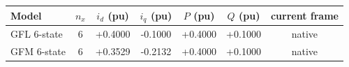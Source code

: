 \begin{tabular}{lcccccc}\toprule
Model & $n_x$ & $i_d$ (pu) & $i_q$ (pu) & $P$ (pu) & $Q$ (pu) & current frame\\\midrule
GFL 6-state & 6 & +0.4000 & -0.1000 & +0.4000 & +0.1000 & native\\
GFM 6-state & 6 & +0.3529 & -0.2132 & +0.4000 & +0.1000 & native\\
\bottomrule
\end{tabular}
